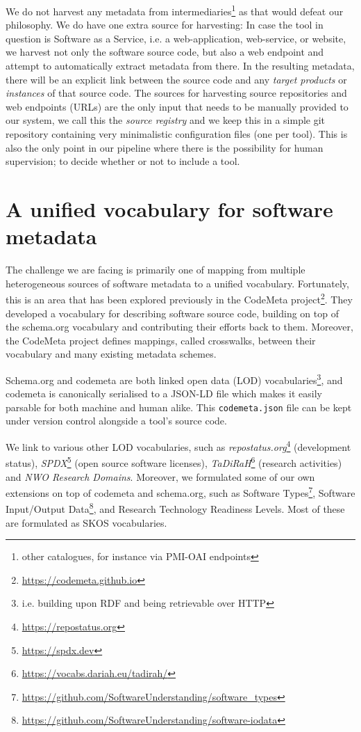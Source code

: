 \documentclass[a4paper,11pt]{article}
\begin{document}
We do not harvest any metadata from intermediaries\footnote{other catalogues, for instance via PMI-OAI
endpoints} as that would defeat our philosophy. We do have one extra source for
harvesting: In case the tool in question is Software as a Service, i.e. a
web-application, web-service, or website, we harvest not only the software
source code, but also a web endpoint and attempt to automatically extract
metadata from there. In the resulting metadata, there will be an explicit link
between the source code and any \emph{target products} or \emph{instances} of
that source code. The sources for harvesting source repositories and web
endpoints (URLs) are the only input that needs to be manually provided to our
system, we call this the \emph{source registry} and we keep this in a simple
git repository containing very minimalistic configuration files (one per tool).
This is also the only point in our pipeline where there is the possibility for
human supervision; to decide whether or not to include a tool.

\section{A unified vocabulary for software metadata}

The challenge we are facing is primarily one of mapping from multiple
heterogeneous sources of software metadata to a unified vocabulary.
Fortunately, this is an area that has been explored previously in the CodeMeta
project\footnote{\url{https://codemeta.github.io}}. They developed a
vocabulary for describing software source code, building on top of the
schema.org vocabulary and contributing their efforts back to them. Moreover,
the CodeMeta project defines mappings, called crosswalks, between their
vocabulary and many existing metadata schemes. 

Schema.org and codemeta are both linked open data (LOD) vocabularies\footnote{i.e.
building upon RDF and being retrievable over HTTP}, and codemeta is canonically
serialised to a JSON-LD file which makes it easily parsable for both machine
and human alike. This \texttt{codemeta.json} file can be kept under version
control alongside a tool's source code. 

We link to various other LOD vocabularies, such as
\emph{repostatus.org}\footnote{\url{https://repostatus.org}} (development
status), \emph{SPDX}\footnote{\url{https://spdx.dev}} (open source software
licenses), \emph{TaDiRaH}\footnote{\url{https://vocabs.dariah.eu/tadirah/}}
(research activities) and \emph{NWO Research Domains}. Moreover, we
formulated some of our own extensions on top of codemeta and schema.org, such
as Software
Types\footnote{\url{https://github.com/SoftwareUnderstanding/software_types}},
Software Input/Output
Data\footnote{\url{https://github.com/SoftwareUnderstanding/software-iodata}},
and Research Technology Readiness Levels. Most of these are formulated as SKOS
vocabularies.
\end{document}
